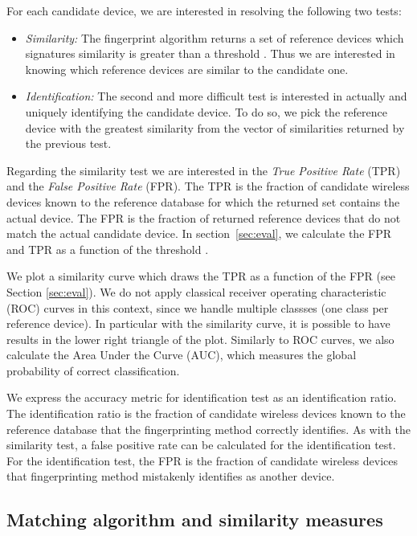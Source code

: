 \documentclass[10pt, conference, compsocconf, letterpaper]{IEEEtran}
\begin{document}
For each candidate device, we are interested in resolving the following two tests: 
\begin{itemize}
\item \emph{Similarity:} The fingerprint algorithm returns a set of reference devices which signatures similarity
 is greater than a threshold . Thus we are interested in knowing which reference devices are
similar to the candidate one.

\item \emph{Identification:} The second and more difficult test is interested in actually and uniquely identifying the candidate device.
To do so, we pick the reference device with the greatest similarity from the vector of similarities returned by the previous test. 

\end{itemize}

Regarding the similarity test we are interested in the {\em True Positive Rate} (TPR) and the {\em False Positive Rate} (FPR).
The TPR is the fraction of candidate wireless devices known to the reference database 
for which the returned set contains the actual device.
The FPR is the fraction of returned reference devices that do not match the actual candidate device.
In section~\ref{sec:eval}, we calculate the FPR and TPR as a function of the threshold .

We plot a similarity curve which draws the TPR as a function of the FPR (see Section \ref{sec:eval}). We do not apply classical receiver operating characteristic (ROC) curves in this context, since we handle multiple classses (one class per reference device). In particular with the similarity curve, it is possible to have results in the lower right triangle of the plot.
Similarly to ROC curves, we also calculate the Area Under the Curve (AUC), which measures the global probability of correct classification.




We express the accuracy metric for identification test as an identification ratio. The identification ratio is the fraction of candidate wireless devices 
known to the reference database that the fingerprinting method correctly identifies. 
As with the similarity test, a false positive rate can be calculated for the identification test. 
For the identification test, the FPR is the fraction of candidate wireless devices that fingerprinting method mistakenly identifies as another 
device.


\subsection{Matching algorithm and similarity measures}
\label{sec:simil}
\end{document}
